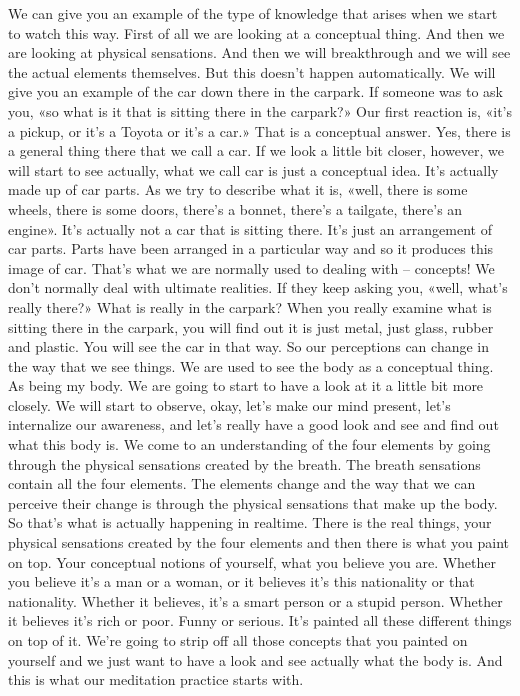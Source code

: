 \documentclass[letterpaper,10pt,english]{sphinxmanual}
\begin{document}
\sphinxAtStartPar
We can give you an example of the type of knowledge that arises when
we start to watch this way. First of all we are looking at a conceptual thing.
And  then  we  are  looking  at  physical  sensations. And  then  we  will  breakthrough  and  we  will  see  the  actual  elements  themselves.  But  this  doesn’t
happen automatically. We will give you an example of the car down there
in the carpark. If someone was to ask you, «so what is it that is sitting there
in the carpark?» Our first reaction is, «it’s a pick\sphinxhyphen{}up, or it’s a Toyota or it’s a
car.» That is a conceptual answer. Yes, there is a general thing there that we
call a car. If we look a little bit closer, however, we will start to see actually,
what we call car is just a conceptual idea. It’s actually made up of car parts.
As we try to describe what it is, «well, there is some wheels, there is some
  doors, there’s a bonnet, there’s a tailgate, there’s an engine». It’s actually not
a car that is sitting there. It’s just an arrangement of car parts. Parts have been
arranged in a particular way and so it produces this image of car. That’s what
we  are  normally  used  to  dealing  with  –  concepts! We  don’t  normally  deal
with ultimate realities. If they keep asking you, «well, what’s really there?»
What is really in the carpark? When you really examine what is sitting there
in the carpark, you will find out it is just metal, just glass, rubber and plastic. You will see the car in that way. So our perceptions can change in the
way that we see things. We are used to see the body as a conceptual thing.
As being my body. We are going to start to have a look at it a little bit more
closely.  We  will  start  to  observe,  okay,  let’s  make  our  mind  present,  let’s
internalize our awareness, and let’s really have a good look and see and find
out what this body is. We come to an understanding of the four elements by
going through the physical sensations created by the breath. The breath sensations contain all the four elements. The elements change and the way that
we can perceive their change is through the physical sensations that make
up the body.
So that’s what is actually happening in real\sphinxhyphen{}time. There is the real things, your physical sensations created by
the four elements and then there is what you paint on top. Your conceptual
notions of yourself, what you believe you are. Whether you believe it’s a man
or a woman, or it believes it’s this nationality or that nationality. Whether it
believes, it’s a smart person or a stupid person. Whether it believes it’s rich
or poor. Funny or serious. It’s painted all these different things on top of it.
We’re going to strip off all those concepts that you painted on yourself and
we just want to have a look and see actually what the body is. And this is
what our meditation practice starts with.
\end{document}
